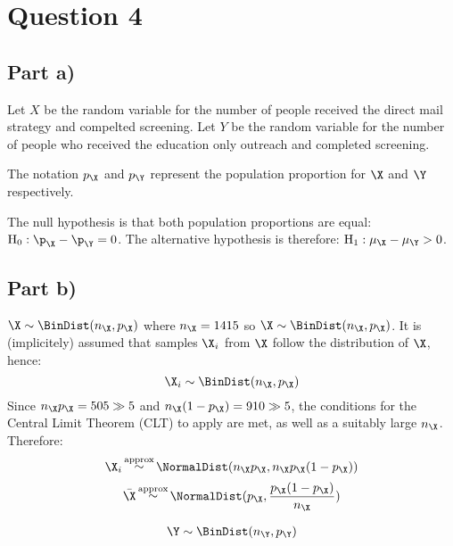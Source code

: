 \section{Question 4}

\subsection{Part a)}
Let $X$ be the random variable for the number of people received the direct mail strategy and compelted screening.
Let $Y$ be the random variable for the number of people who received the education only outreach and completed screening.

The notation $p_\X$ and $p_\Y$ represent the population proportion for $\X$ and $\Y$ respectively.

The null hypothesis is that both population proportions are equal: $\text{H}_0: \p_\X - \p_\Y = 0$. The alternative hypothesis is therefore: $\text{H}_1 : \mu_\X - \mu_\Y > 0$.

\subsection{Part b)}

$\X \sim \BinDist (n_\X, p_\X)$ where $n_\X = 1415$ so $\X \sim \BinDist (n_\X, p_\X)$.
It is (implicitely) assumed that samples $\X_i$ from $\X$ follow the distribution of $\X$, hence:
\[
\X_i \sim \BinDist(n_\X, p_\X)
\]
Since $n_\X p_\X = 505 \gg 5$ and $n_\X(1-p_\X)=910 \gg 5$, the conditions for the Central Limit Theorem (CLT) to apply are met, as well as a suitably large $n_\X$.
Therefore:
\[
\X_i \mathop \sim ^\text{approx} \NormalDist (n_\X p_\X, n_\X p_\X (1 - p_\X))
\]
\[
\bar{\X} \mathop \sim ^\text{approx} \NormalDist (p_\X, \frac{p_\X (1 - p_\X)}{n_\X})
\]


\begin{align*}
\Y \sim \BinDist (n_\Y, p_\Y)
\end{align*}

